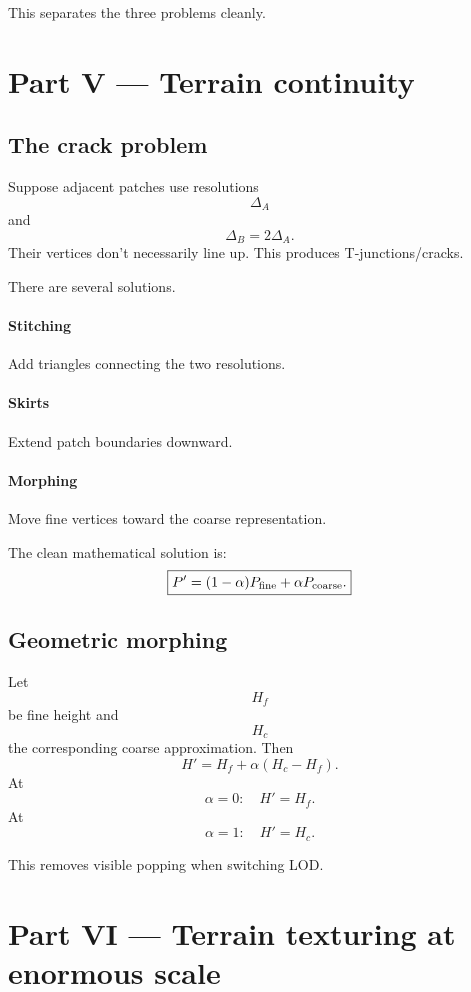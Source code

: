 \documentclass[12pt]{article}
\begin{document}
	This separates the three problems cleanly.
	
	\section*{Part V — Terrain continuity}
	
	\subsection{The crack problem}
	
	Suppose adjacent patches use resolutions
	\[
	\Delta_A
	\]
	and
	\[
	\Delta_B=2\Delta_A.
	\]
	Their vertices don't necessarily line up.
	This produces T-junctions/cracks.
	
	There are several solutions.
	
	\paragraph{Stitching}
	Add triangles connecting the two resolutions.
	
	\paragraph{Skirts}
	Extend patch boundaries downward.
	
	\paragraph{Morphing}
	Move fine vertices toward the coarse representation.
	
	The clean mathematical solution is:
	\[
	\boxed{
		P'=(1-\alpha)P_{\rm fine} +\alpha P_{\rm coarse}.
	}
	\]
	
	\subsection{Geometric morphing}
	
	Let
	\[
	H_f
	\]
	be fine height and
	\[
	H_c
	\]
	the corresponding coarse approximation.
	Then
	\[
	\boxed{
		H'= H_f+ \alpha(H_c-H_f).
	}
	\]
	At
	\[
	\alpha=0: \quad H'=H_f.
	\]
	At
	\[
	\alpha=1: \quad H'=H_c.
	\]
	
	This removes visible popping when switching LOD.
	
	\section*{Part VI — Terrain texturing at enormous scale}
	
\end{document}
